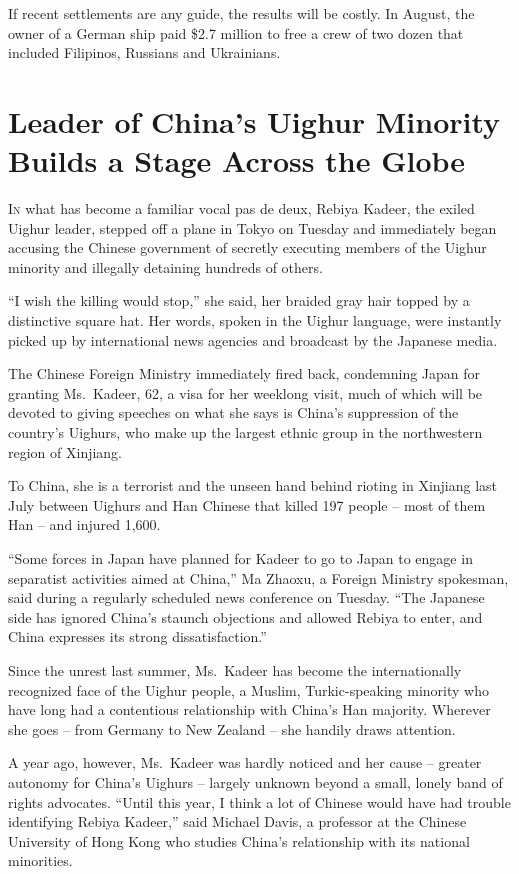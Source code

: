 ﻿\documentclass[12pt]{article}
\begin{document}
If recent settlements are any guide, the results will be costly. In August, the owner of a German
ship paid \$2.7 million to free a crew of two dozen that included Filipinos, Russians and
Ukrainians.

\section{Leader of China's Uighur Minority Builds a Stage Across the Globe}

\lettrine{I}{n} what has become a familiar vocal pas de deux, Rebiya Kadeer,
the exiled Uighur leader, stepped off a plane in Tokyo on Tuesday and immediately began accusing the
Chinese government of secretly executing members of the Uighur minority and illegally detaining
hundreds of others.

``I wish the killing would stop,'' she said, her braided gray hair topped by a distinctive square
hat. Her words, spoken in the Uighur language, were instantly picked up by international news
agencies and broadcast by the Japanese media.

The Chinese Foreign Ministry immediately fired back, condemning Japan for granting Ms.~Kadeer, 62, a
visa for her weeklong visit, much of which will be devoted to giving speeches on what she says is
China's suppression of the country's Uighurs, who make up the largest ethnic group in the
northwestern region of Xinjiang.

To China, she is a terrorist and the unseen hand behind rioting in Xinjiang last July between
Uighurs and Han Chinese that killed 197 people -- most of them Han -- and injured 1,600.

``Some forces in Japan have planned for Kadeer to go to Japan to engage in separatist activities
aimed at China,'' Ma Zhaoxu, a Foreign Ministry spokesman, said during a regularly scheduled news
conference on Tuesday. ``The Japanese side has ignored China's staunch objections and allowed Rebiya
to enter, and China expresses its strong dissatisfaction.''

Since the unrest last summer, Ms.~Kadeer has become the internationally recognized face of the
Uighur people, a Muslim, Turkic-speaking minority who have long had a contentious relationship with
China's Han majority. Wherever she goes -- from Germany to New Zealand -- she handily draws
attention.

A year ago, however, Ms.~Kadeer was hardly noticed and her cause -- greater autonomy for China's
Uighurs -- largely unknown beyond a small, lonely band of rights advocates. ``Until this year, I
think a lot of Chinese would have had trouble identifying Rebiya Kadeer,'' said Michael Davis, a
professor at the Chinese University of Hong Kong who studies China's relationship with its national
minorities.
\end{document}
